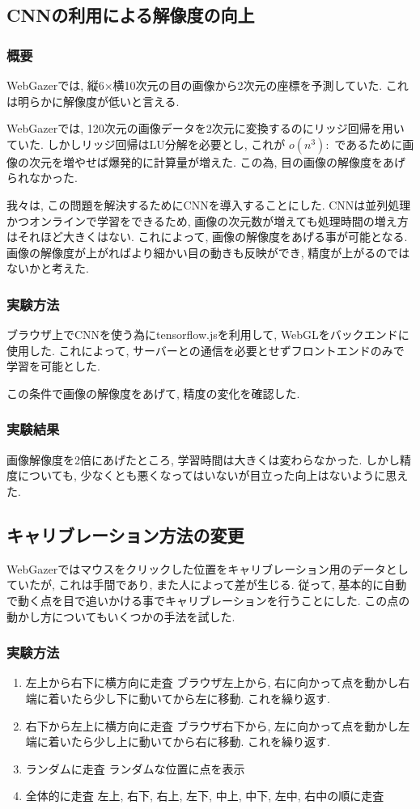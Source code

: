 \documentclass[a4paper,11pt]{jsarticle}
\begin{document}
\subsection{CNNの利用による解像度の向上}
\subsubsection{概要}
WebGazerでは, 縦6×横10次元の目の画像から2次元の座標を予測していた. これは明らかに解像度が低いと言える.

WebGazerでは, 120次元の画像データを2次元に変換するのにリッジ回帰を用いていた.
しかしリッジ回帰はLU分解を必要とし, これが $o(n^3):$ であるために画像の次元を増やせば爆発的に計算量が増えた.
この為, 目の画像の解像度をあげられなかった.

我々は, この問題を解決するためにCNNを導入することにした.
CNNは並列処理かつオンラインで学習をできるため, 画像の次元数が増えても処理時間の増え方はそれほど大きくはない.
これによって, 画像の解像度をあげる事が可能となる.
画像の解像度が上がればより細かい目の動きも反映ができ, 精度が上がるのではないかと考えた.

\subsubsection{実験方法}
ブラウザ上でCNNを使う為にtensorflow.jsを利用して, WebGLをバックエンドに使用した.
これによって, サーバーとの通信を必要とせずフロントエンドのみで学習を可能とした.

この条件で画像の解像度をあげて, 精度の変化を確認した.

\subsubsection{実験結果}
画像解像度を2倍にあげたところ, 学習時間は大きくは変わらなかった.
しかし精度についても, 少なくとも悪くなってはいないが目立った向上はないように思えた.



\subsection{キャリブレーション方法の変更}
WebGazerではマウスをクリックした位置をキャリブレーション用のデータとしていたが, これは手間であり, また人によって差が生じる.
従って, 基本的に自動で動く点を目で追いかける事でキャリブレーションを行うことにした. 
この点の動かし方についてもいくつかの手法を試した.

\subsubsection{実験方法}
\begin{enumerate}
  \item{左上から右下に横方向に走査} ブラウザ左上から, 右に向かって点を動かし右端に着いたら少し下に動いてから左に移動. これを繰り返す.
  \item{右下から左上に横方向に走査} ブラウザ右下から, 左に向かって点を動かし左端に着いたら少し上に動いてから右に移動. これを繰り返す.
  \item{ランダムに走査} ランダムな位置に点を表示
  \item{全体的に走査} 左上, 右下, 右上, 左下, 中上, 中下, 左中, 右中の順に走査
\end{enumerate}
\end{document}
